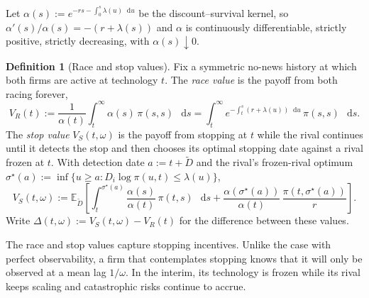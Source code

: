 \documentclass[12pt,reqno]{article}
\newcommand{\de}{\mathop{}\!\mathrm{d}}
\newcommand{\Ex}{\mathbb{E}}
\theoremstyle{definition} \newtheorem{example}{Example}
\theoremstyle{definition} \newtheorem{condition}{Condition}
\theoremstyle{definition} \newtheorem{corollary}{Corollary}
\theoremstyle{definition} \newtheorem{claim}{Claim}
\theoremstyle{definition} \newtheorem{definition}{Definition}
\theoremstyle{definition} \newtheorem{conjecture}{Conjecture}
\theoremstyle{definition} \newtheorem{Lemma}{Lemma}
\theoremstyle{definition} \newtheorem{lemma}{Lemma}
\theoremstyle{plain} \newtheorem{theorem}{Theorem}
\theoremstyle{definition} \newtheorem{assumption}{Assumption}
\theoremstyle{definition} \newtheorem*{assumptionnonumber}{Assumption}
\theoremstyle{definition} \newtheorem*{theoremNoNumber}{Proposition}
\theoremstyle{definition}
\theoremstyle{definition}\newtheorem{proposition}{Proposition}
\theoremstyle{definition} \newtheorem{result}{Result}
\theoremstyle{definition} \newtheorem*{definitionNoNumber}{Definition}
\theoremstyle{definition} \newtheorem{Definition}{Definition}
\theoremstyle{definition} \newtheorem*{DefinitionNoNumber}{Definition}
\theoremstyle{definition} \newtheorem*{fact}{Fact}
\theoremstyle{definition} \newtheorem*{property}{Property}
\theoremstyle{definition} \newtheorem{remark}{Remark}
\begin{document}

Let $\alpha(s):=e^{-rs-\int_0^s\lambda(u)\de u}$ be the discount--survival kernel, so $\alpha'(s)/\alpha(s)=-(r+\lambda(s))$ and $\alpha$ is continuously differentiable, strictly positive, strictly decreasing, with $\alpha(s)\downarrow0$. 

\begin{definition}[Race and stop values]\label{def:VRVS} Fix a symmetric no-news history at which both firms are active at technology $t$. The \emph{race value} is the payoff from both racing forever,
\[
V_R(t):=\frac1{\alpha(t)}\int_t^\infty \alpha(s)\,\pi(s,s)\,\de s
=\int_t^\infty e^{-\int_t^s(r+\lambda(u))\de u}\,\pi(s,s)\,\de s.
\]
The \emph{stop value} $V_S(t,\omega)$ is the payoff from stopping at $t$ while the rival continues until it detects the stop and then chooses its optimal stopping date against a rival frozen at $t.$  With detection date $a:=t+\widetilde D$ and the rival's frozen-rival optimum $\sigma^\star(a):=\inf\{u\ge a:D_i\log\pi(u,t)\le\lambda(u)\}$,
\[
V_S(t,\omega):=\Ex_{\widetilde D}\!\left[\int_t^{\sigma^\star(a)}\frac{\alpha(s)}{\alpha(t)}\,\pi(t,s)\,\de s+\frac{\alpha(\sigma^\star(a))}{\alpha(t)}\,\frac{\pi(t,\sigma^\star(a))}{r}\right].
\]
Write $\Delta(t,\omega):=V_S(t,\omega)-V_R(t)$ for the difference between these values.
\end{definition}

The race and stop values capture stopping incentives. Unlike the case with perfect observability, a firm that contemplates stopping knows that it will only be observed at a mean lag $1/\omega$. In the interim, its technology is frozen while its rival keeps scaling and catastrophic risks continue to accrue. 
\end{document}

